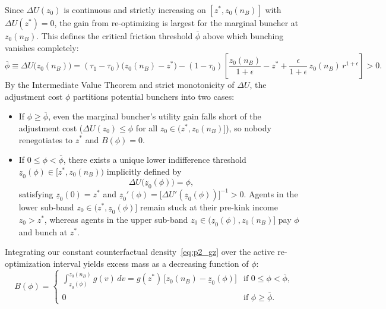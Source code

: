 Since $\Delta U(z_0)$ is continuous and strictly increasing on $[z^*, z_0(n_B)]$ with $\Delta U(z^*) = 0$, the gain from re-optimizing is largest for the marginal buncher at $z_0(n_B)$. This defines the critical friction threshold $\overline{\phi}$ above which bunching vanishes completely:
\begin{equation}
\overline{\phi} \equiv \Delta U\big(z_0(n_B)\big)
= (\tau_1 - \tau_0)\big(z_0(n_B) - z^*\big) - (1-\tau_0)\left[\frac{z_0(n_B)}{1+\epsilon} - z^* + \frac{\epsilon}{1+\epsilon}\,z_0(n_B)\,r^{1+\epsilon}\right] > 0.
\label{eq:p2_phibar}
\end{equation}
By the Intermediate Value Theorem and strict monotonicity of $\Delta U$, the adjustment cost $\phi$ partitions potential bunchers into two cases:
\begin{itemize}
    \item If $\phi \ge \overline{\phi}$, even the marginal buncher's utility gain falls short of the adjustment cost ($\Delta U(z_0) \le \phi$ for all $z_0 \in (z^*, z_0(n_B)]$), so nobody renegotiates to $z^*$ and $B(\phi) = 0$.
    \item If $0 \le \phi < \overline{\phi}$, there exists a unique lower indifference threshold $\underline{z}_0(\phi) \in [z^*, z_0(n_B))$ implicitly defined by
    \begin{equation}
    \Delta U\big(\underline{z}_0(\phi)\big) = \phi,
    \label{eq:p2_z0_phi_implicit}
    \end{equation}
    satisfying $\underline{z}_0(0) = z^*$ and $\underline{z}_0'(\phi) = \big[\Delta U'(\underline{z}_0(\phi))\big]^{-1} > 0$. Agents in the lower sub-band $z_0 \in \big(z^*, \underline{z}_0(\phi)\big]$ remain stuck at their pre-kink income $z_0 > z^*$, whereas agents in the upper sub-band $z_0 \in \big(\underline{z}_0(\phi), z_0(n_B)\big]$ pay $\phi$ and bunch at $z^*$.
\end{itemize}
Integrating our constant counterfactual density~\eqref{eq:p2_gz} over the active re-optimization interval yields excess mass as a decreasing function of $\phi$:
\begin{equation}
B(\phi) = \begin{cases}
\displaystyle \int_{\underline{z}_0(\phi)}^{z_0(n_B)} g(v)\,dv = g(z^*)\,\big[z_0(n_B) - \underline{z}_0(\phi)\big] & \text{if } 0 \le \phi < \overline{\phi}, \\[8pt]
0 & \text{if } \phi \ge \overline{\phi}.
\end{cases}
\label{eq:p2_B_phi}
\end{equation}

